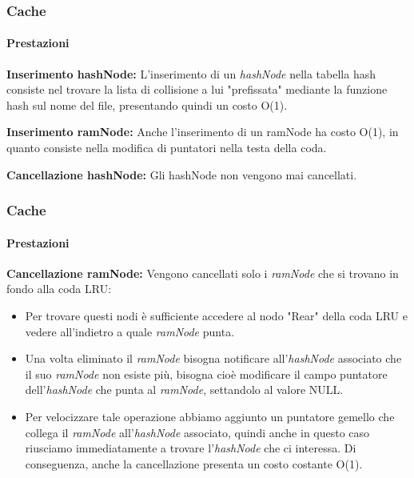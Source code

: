 \documentclass{beamer}
\begin{document}
\begin{frame}
\frametitle{Cache}
\framesubtitle{Prestazioni}

\textbf{Inserimento hashNode:}
L'inserimento di un \textit{hashNode} nella tabella hash consiste nel trovare la lista
di collisione a lui "prefissata" mediante la funzione hash sul nome del file,
presentando quindi un costo O(1).

\medskip

\textbf{Inserimento ramNode:}
Anche l’inserimento di un ramNode ha costo O(1), in quanto consiste
nella modifica di puntatori nella testa della coda.

\medskip

\textbf{Cancellazione hashNode:} Gli hashNode non vengono mai cancellati.
\end{frame}
\begin{frame}
\frametitle{Cache}
\framesubtitle{Prestazioni}

\textbf{Cancellazione ramNode:} Vengono cancellati solo i \textit{ramNode}
che si trovano in fondo alla coda LRU:

\begin{itemize}


\item Per trovare questi nodi è sufficiente
accedere al nodo "Rear" della coda LRU e vedere all'indietro a quale
\textit{ramNode} punta.

\medskip

\item Una volta eliminato il \textit{ramNode} bisogna notificare all'\textit{hashNode} associato
che il suo \textit{ramNode} non esiste più, bisogna cioè modificare il campo
puntatore dell'\textit{hashNode} che punta al \textit{ramNode}, settandolo al valore
NULL.

\medskip

\item Per velocizzare tale operazione abbiamo aggiunto un puntatore
gemello che collega il \textit{ramNode} all'\textit{hashNode} associato, quindi anche in
questo caso riusciamo immediatamente a trovare l'\textit{hashNode} che ci
interessa. Di conseguenza, anche la cancellazione presenta un costo
costante O(1).


\end{itemize}

\end{frame}
\end{document}
